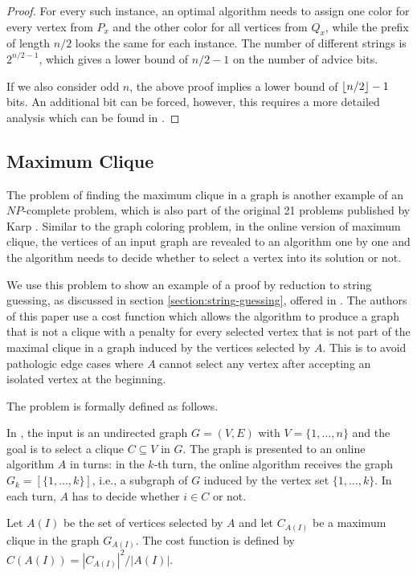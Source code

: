 \begin{proof}
    For every such instance, an optimal algorithm needs to assign one
    color for every vertex from $P_x$ and the other color for all vertices
    from $Q_x$, while the prefix of length $n/2$ looks the same for each
    instance. The number of different strings is $2^{n/2-1}$, which gives
    a lower bound of $n/2-1$ on the number of advice bits.

    If we also consider odd $n$, the above proof implies a lower bound of
    $\lfloor n/2\rfloor-1$ bits. An additional bit can be forced, however, this
    requires a more detailed analysis which can be found in
    \cite{misof-trivial-graphs}.
\end{proof}

\subsection{Maximum Clique}

The problem of finding the maximum clique in a graph is another example of
an $NP$-complete problem, which is also part of the original 21 problems
published by Karp \cite{karp-np}. Similar to the graph coloring problem,
in the online version of maximum clique, the vertices of an input graph
are revealed to an algorithm one by one and the algorithm needs to decide
whether to select a vertex into its solution or not.

We use this problem to show an example of a proof by reduction to string
guessing, as discussed in section \ref{section:string-guessing}, offered in
\cite{string-guessing}. The authors of this paper use a cost function
which allows the algorithm to produce a graph that is not a clique with a
penalty for every selected vertex that is not part of the maximal clique
in a graph induced by the vertices selected by $A$. This is to avoid
pathologic edge cases where $A$ cannot select any vertex after accepting
an isolated vertex at the beginning.

The problem is formally defined as follows.

\begin{definition}\label{definition:max-clique}
    In , the input is an undirected graph $G = (V, E)$
    with $V = \{1, \dots, n\}$ and the goal is to select a clique $C
    \subseteq V$ in $G$. The graph is presented to an online algorithm $A$
    in turns: in the $k$-th turn, the online algorithm receives the graph
    $G_k = [\{1, \dots, k\}]$, i.e., a subgraph of $G$ induced by the
    vertex set $\{1, \dots, k\}$. In each turn, $A$ has to decide whether
    $i \in C$ or not.

    Let $A(I)$ be the set of vertices selected by $A$ and let $C_{A(I)}$
    be a maximum clique in the graph $G_{A(I)}$. The cost function is
    defined by $C(A(I)) = |C_{A(I)}|^2 / |A(I)|$.
\end{definition}


